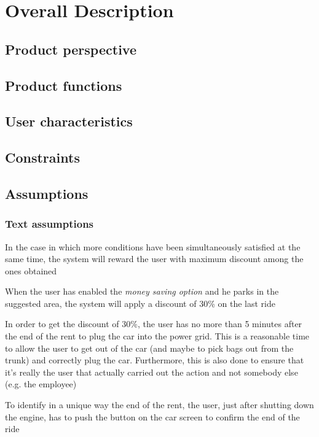 \documentclass[11pt,a4paper]{report}
\begin{document}
\chapter{Overall Description}
\section{Product perspective}
\section{Product functions}
\section{User characteristics}
\section{Constraints}
\section{Assumptions}
\subsection{Text assumptions}
\begin{TA}
	\item In the case in which more conditions have been simultaneously satisfied at the same time, the system will reward the user with maximum discount among the ones obtained
	\item When the user has enabled the \textit{money saving option} and he parks in the suggested area, the system will apply a discount of 30\% on the last ride
	\item In order to get the discount of 30\%, the user has no more than 5 minutes after the end of the rent to plug the car into the power grid. This is a reasonable time to allow the user to get out of the car (and maybe to pick bags out from the trunk) and correctly plug the car. Furthermore, this is also done to ensure that it's really the user that actually carried out the action and not somebody else (e.g. the employee)
	\item To identify in a unique way the end of the rent, the user, just after shutting down the engine, has to push the button on the car screen to confirm the end of the ride
\end{TA}
\end{document}
